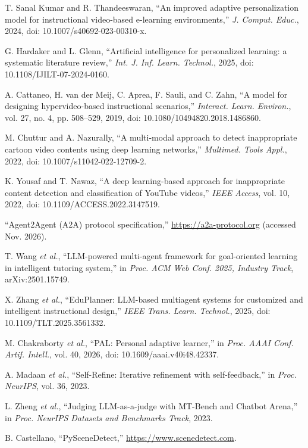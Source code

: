 \documentclass[9pt,a4paper]{extarticle}
\begin{document}
{\fontsize{8.5}{10}\selectfont
\begin{enumerate}[label={[\arabic*]},leftmargin=*,itemsep=0pt,topsep=2pt]
\item T. Sanal Kumar and R. Thandeeswaran, ``An improved adaptive personalization model for instructional video-based
e-learning environments,'' \emph{J. Comput. Educ.}, 2024, doi: 10.1007/s40692-023-00310-x.
\item G. Hardaker and L. Glenn, ``Artificial intelligence for personalized learning: a systematic literature review,''
\emph{Int. J. Inf. Learn. Technol.}, 2025, doi: 10.1108/IJILT-07-2024-0160.
\item A. Cattaneo, H. van der Meij, C. Aprea, F. Sauli, and C. Zahn, ``A model for designing hypervideo-based
instructional scenarios,'' \emph{Interact. Learn. Environ.}, vol. 27, no. 4, pp. 508--529, 2019, doi:
10.1080/10494820.2018.1486860.
\item M. Chuttur and A. Nazurally, ``A multi-modal approach to detect inappropriate cartoon video contents using deep
learning networks,'' \emph{Multimed. Tools Appl.}, 2022, doi: 10.1007/s11042-022-12709-2.
\item K. Yousaf and T. Nawaz, ``A deep learning-based approach for inappropriate content detection and classification
of YouTube videos,'' \emph{IEEE Access}, vol. 10, 2022, doi: 10.1109/ACCESS.2022.3147519.
\item ``Agent2Agent (A2A) protocol specification,'' \url{https://a2a-protocol.org} (accessed Nov. 2026).
\item T. Wang \emph{et al.}, ``LLM-powered multi-agent framework for goal-oriented learning in intelligent tutoring
system,'' in \emph{Proc. ACM Web Conf. 2025, Industry Track}, arXiv:2501.15749.
\item X. Zhang \emph{et al.}, ``EduPlanner: LLM-based multiagent systems for customized and intelligent instructional
design,'' \emph{IEEE Trans. Learn. Technol.}, 2025, doi: 10.1109/TLT.2025.3561332.
\item M. Chakraborty \emph{et al.}, ``PAL: Personal adaptive learner,'' in \emph{Proc. AAAI Conf. Artif. Intell.}, vol.
40, 2026, doi: 10.1609/aaai.v40i48.42337.
\item A. Madaan \emph{et al.}, ``Self-Refine: Iterative refinement with self-feedback,'' in \emph{Proc. NeurIPS}, vol.
36, 2023.
\item L. Zheng \emph{et al.}, ``Judging LLM-as-a-judge with MT-Bench and Chatbot Arena,'' in \emph{Proc. NeurIPS
Datasets and Benchmarks Track}, 2023.
\item B. Castellano, ``PySceneDetect,'' \url{https://www.scenedetect.com}.

\end{enumerate}}
\end{document}
